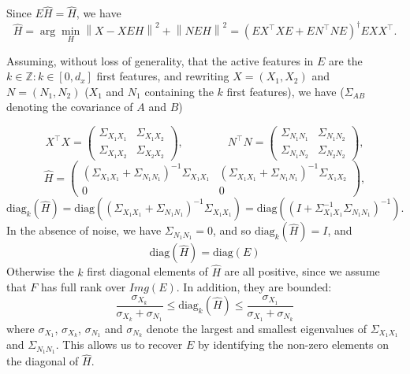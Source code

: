 \documentclass{article}
\begin{document}
Since  $E\hat H = \hat H$, we have
\begin{equation}
  \hat H = \arg \min_H  \left \| X - XEH\right\| ^2  + \left \| NEH\right \| ^2 = (E X^\top XE +EN^\top NE) ^\dagger EXX^\top.
\end{equation}

Assuming, without loss of generality, that the active features in $E$ are the $k \in \mathbb{Z}: k \in [0, d_x]$ first features, and rewriting $X=(X_1,X_2)$ and $N=(N_1,N_2)$ ($X_1$ and $N_1$ containing the $k$ first features), we have ($\Sigma_{A B}$ denoting the covariance of $A$ and $B$)

\begin{equation}
  X^\top X = \left(\begin{array}{lccl}\Sigma_{X_1 X_1} & \Sigma_{X_1 X_2} \\ \Sigma_{X_1 X_2} & \Sigma_{X_2 X_2}\end{array}\right),\qquad\qquad N^\top N = \left(\begin{array}{lccl}\Sigma_{N_1 N_1} & \Sigma_{N_1 N_2} \\ \Sigma_{N_1 N_2} & \Sigma_{N_2 N_2}\end{array}\right),
\end{equation}
\begin{equation}
  \hat H = \left(\begin{array}{cc}(\Sigma_{X_1 X_1}+\Sigma_{N_1 N_1})^{-1}\Sigma_{X_1 X_1} & (\Sigma_{X_1 X_1}+\Sigma_{N_1 N_1})^{-1}\Sigma_{X_1 X_2} \\0 & 0\end{array}\right),
\end{equation}
\begin{equation}
  \text{diag}_k (\hat H) = \text{diag}((\Sigma_{X_1 X_1}+\Sigma_{N_1 N_1})^{-1}\Sigma_{X_1 X_1}) = \text{diag}((I+\Sigma_{X_1 X_1}^{-1}\Sigma_{N_1 N_1})^{-1}).
\end{equation}
%
%
In the absence of noise, we have $\Sigma_{N_1 N_1}=0$, and so $\text{diag}_k(\hat H)=I$, and $$\text{diag}(\hat H) = \text{diag}(E)$$
Otherwise the $k$ first diagonal elements of $\hat H$ are all positive, since we assume that $F$ has full rank over $Img(E)$. In addition, they are bounded:
$$\frac{\sigma_{X_k}}{\sigma_{X_k} +\sigma_{N_1}} \leq \text{diag}_k(\hat{H})\leq  \frac{\sigma_{X_1}}{\sigma_{X_1} +\sigma_{N_k}}$$
where  $\sigma_{X_1}$, $\sigma_{X_k}$, $\sigma_{N_1}$ and $\sigma_{N_k}$ denote the largest and smallest eigenvalues of $\Sigma_{X_1 X_1}$ and $\Sigma_{N_1 N_1}$. This allows us to recover $E$ by identifying the non-zero elements on the diagonal of $\hat{H}$. 
\end{document}
